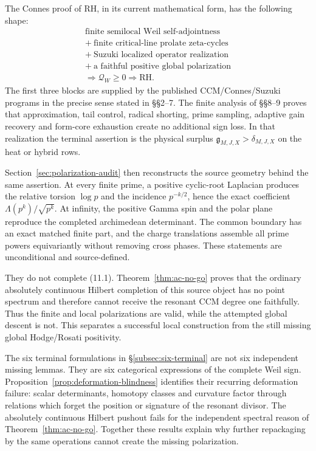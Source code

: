 \documentclass[11pt]{amsart}
\theoremstyle{definition}
\theoremstyle{remark}
\newcommand{\RH}{\mathrm{RH}}
\newcommand{\QW}{\mathcal Q_W}
\begin{document}
The Connes proof of RH, in its current mathematical form, has the following
shape:
\[
\boxed{
\begin{gathered}
\text{finite semilocal Weil self-adjointness}\\
+\ \text{finite critical-line prolate zeta-cycles}\\
+\ \text{Suzuki localized operator realization}\\
+\ \text{a faithful positive global polarization}\\
\Longrightarrow \QW\ge0
\Longrightarrow \RH .
\end{gathered}}
\tag{11.1}
\]
The first three blocks are supplied by the published
CCM/Connes/Suzuki programs in the precise sense stated in
\S\S2--7.  The finite analysis of \S\S8--9 proves that approximation,
tail control, radical shorting, prime sampling, adaptive gain recovery and
form-core exhaustion create no additional sign loss.  In that realization
the terminal assertion is the physical surplus
\(\mathfrak g_{M,J,X}>\delta_{M,J,X}\) on the heat or hybrid rows.

Section~\ref{sec:polarization-audit} then reconstructs the source geometry
behind the same assertion.  At every finite prime, a positive cyclic-root
Laplacian produces the relative torsion \(\log p\) and the incidence
\(p^{-k/2}\), hence the exact coefficient
\(\Lambda(p^k)/\sqrt{p^k}\).  At infinity, the positive Gamma spin and the
polar plane reproduce the completed archimedean determinant.  The common
boundary has an exact matched finite part, and the charge translations
assemble all prime powers equivariantly without removing cross phases.
These statements are unconditional and source-defined.

They do not complete (11.1).  Theorem~\ref{thm:ac-no-go} proves that the
ordinary absolutely continuous Hilbert completion of this source object
has no point spectrum and therefore cannot receive the resonant CCM degree
one faithfully.  Thus the finite and local polarizations are valid, while
the attempted global descent is not.  This separates a successful local
construction from the still missing global Hodge/Rosati positivity.

The six terminal formulations in \S\ref{subsec:six-terminal} are not six independent missing
lemmas.  They are six categorical expressions of the complete Weil sign.
Proposition~\ref{prop:deformation-blindness} identifies their recurring
deformation failure: scalar determinants, homotopy classes and curvature
factor through relations which forget the position or signature of the
resonant divisor.  The absolutely continuous Hilbert pushout fails for the
independent spectral reason of Theorem~\ref{thm:ac-no-go}.  Together these
results explain why further repackaging by the same operations cannot
create the missing polarization.
\end{document}

